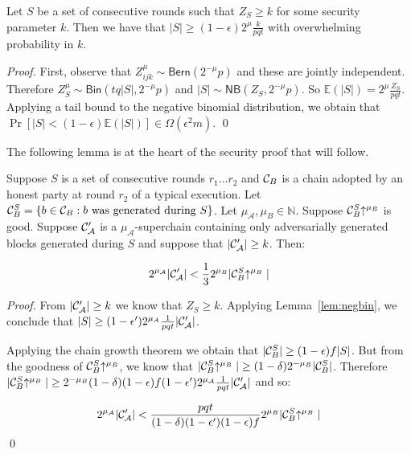 
\begin{lemma}\label{lem:negbin}
    Let $S$ be a set of consecutive rounds such that $Z_S \geq k$ for some
    security parameter $k$. Then we have that $|S| \geq (1 -
    \epsilon)2^\mu\frac{k}{pqt}$ with overwhelming probability in $k$.
\end{lemma}
\begin{proof}
    First, observe that $Z_{ijk}^\mu \sim \textsf{Bern}(2^{-\mu}p)$ and these are
    jointly independent. Therefore $Z_S^\mu \sim \textsf{Bin}(tq|S|, 2^{-\mu}p)$ and
    $|S| \sim \textsf{NB}(Z_S, 2^{-\mu}p)$. So $\mathbb{E}(|S|) =
    2^\mu\frac{Z_S}{pqt}$. Applying a tail bound to the negative binomial
    distribution, we obtain that $\Pr[|S| < (1 - \epsilon)\mathbb{E}(|S|)] \in
    \Omega(\epsilon^2 m)$.
    \qed
\end{proof}

The following lemma is at the heart of the security proof that will follow.


\begin{lemma}\label{lem:level-comparison}
    Suppose $S$ is a set of consecutive rounds $r_1 \ldots r_2$
    and $\mathcal{C}_B$ is
    a chain adopted by an honest party at round $r_2$ of a typical execution.
    Let $\mathcal{C}_B^S = \{b \in
    \mathcal{C}_B: b \textnormal{ was generated during } S\}$. Let $\mu_\mathcal{A},
    \mu_B \in \mathbb{N}$. Suppose $\mathcal{C}_B^S\negthickspace\uparrow^{\mu_B}$ is good.
    Suppose $\mathcal{C}'_\mathcal{A}$ is a $\mu_\mathcal{A}$-superchain containing
    only adversarially generated blocks generated during $S$ and suppose that
    $|\mathcal{C}'_\mathcal{A}| \geq k$.
    Then:

    \begin{equation*}
    2^{\mu_\mathcal{A}}|\mathcal{C}'_\mathcal{A}| < \frac{1}{3}2^{\mu_B}|\mathcal{C}_B^S\negthickspace\uparrow^{\mu_B}|
    \end{equation*}
\end{lemma}
\begin{proof}
    From $|\mathcal{C}'_\mathcal{A}| \geq k$ we know that $Z_S \geq k$. Applying
    Lemma~\ref{lem:negbin}, we conclude that $|S| \geq (1 -
    \epsilon')2^{\mu_A}\frac{1}{pqt}|\mathcal{C}'_\mathcal{A}|$.

    Applying the chain growth theorem \cite{backbone} we obtain that $|\mathcal{C}_B^S|
    \geq (1 - \epsilon)f|S|$. But from the goodness of $\mathcal{C}_B^S\negthickspace\uparrow^{\mu_B}$, we
    know that $|\mathcal{C}_B^S\negthickspace\uparrow^{\mu_B}| \geq (1 -
    \delta)2^{-\mu_B}|\mathcal{C}_B^S|$. Therefore $|\mathcal{C}_B^S\negthickspace\uparrow^{\mu_B}| \geq
    2^{-\mu_B}(1 - \delta)(1 - \epsilon)f(1 -
    \epsilon')2^{\mu_\mathcal{A}}\frac{1}{pqt}|\mathcal{C}'_\mathcal{A}|$ and so:

    \begin{equation*}
    2^{\mu_\mathcal{A}}|\mathcal{C}'_\mathcal{A}|
    <
    \frac{pqt}{(1 - \delta)(1 -
    \epsilon')(1 - \epsilon)f}2^{\mu_B}|\mathcal{C}_B^S\negthickspace\uparrow^{\mu_B}|
    \end{equation*}
    \qed
\end{proof}

